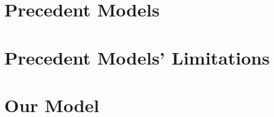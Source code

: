 \documentclass[a4paper]{article}
\begin{document}
\section{Precedent Models}


\section{Precedent Models' Limitations}


\section{Our Model}


% 


% 

% 

% 

% 

% 

\end{document}
